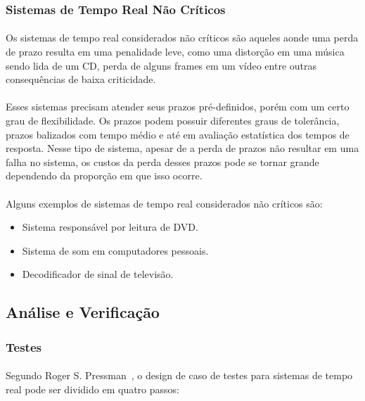 \subsubsection{Sistemas de Tempo Real Não Críticos}
\paragraph{}
Os sistemas de tempo real considerados não críticos são aqueles aonde uma perda de prazo
resulta em uma penalidade leve, como uma distorção em uma música sendo lida de um CD, perda
de alguns frames em um vídeo entre outras consequências de baixa criticidade.
\paragraph{}
Esses sistemas precisam atender seus prazos pré-definidos, porém com um certo grau de flexibilidade.
Os prazos podem possuir diferentes graus de tolerância, prazos balizados com tempo médio e até em avaliação
estatística dos tempos de resposta. Nesse tipo de sistema, apesar de a perda de prazos não resultar em uma
falha no sistema, os custos da perda desses prazos pode se tornar grande dependendo da proporção em que isso
ocorre.~\cite{Li:2003:RCE:829584}

\paragraph{}
Alguns exemplos de sistemas de tempo real considerados não críticos são:
\begin{itemize}
\item Sistema responsável por leitura de DVD.
\item Sistema de som em computadores pessoais.
\item Decodificador de sinal de televisão.
\end{itemize}

\subsection{Análise e Verificação}
\subsubsection{Testes}
\paragraph{}
Segundo Roger S. Pressman~\cite{pre_2005}, o design de caso de testes para sistemas de tempo real pode ser dividido
em quatro passos:

